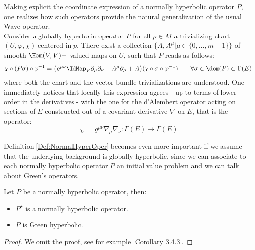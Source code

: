 \documentclass[Main]{subfiles}
\begin{document}
			Making explicit the coordinate expression of a normally hyperbolic operator $P$, one realizes how such operators  provide the natural generalization of the usual Wave operator. 
			\\
			Consider a globally hyperbolic operator $P$ for all $p \in M$ a trivializing chart $(U, \varphi, \chi)$ centered in $p$. 
			There exist a collection $\big\{A, A^\mu \vert \mu\in \{0, \ldots ,m-1\}\big\}$ of smooth 
			$\Hom(V,V)-$ valued maps on $U$, such that $P$ reads as follows:
			\begin{equation}\label{Eq:NormallyHyperbolicRepresentation}
				\chi \circ ( P \sigma) \circ \varphi^{-1} =
				\big( g^{\mu \nu} \IdMap_V \partial_\mu \partial_\nu + A^\mu \partial_\mu + A\big)
				(\chi \circ \sigma \circ \varphi^{-1} ) 
				\qquad \forall \sigma \in \dom(P) \subset \Gamma(E)
			\end{equation}
		where both the chart and the vector bundle trivializations are understood. 
		One immediately notices that locally this expression agrees  - up to terms of lower order in the derivatives  - with the one for the d'Alembert operator acting on sections of $E$  constructed out of a covariant derivative $\nabla$ on $E$, that is the operator:
		\begin{displaymath}
			\square_\nabla = g^{\mu \nu} \nabla_\mu \nabla_\nu : \Gamma(E) \rightarrow \Gamma(E)
		\end{displaymath}

		Definition \ref{Def:NormalHyperOper} becomes even more important if we assume that the underlying background is globally hyperbolic, since we can associate to each normally hyperbolic operator $P$ an initial value problem and we can talk about Green's operators.
		\begin{proposition}
			Let $P$ be a normally hyperbolic operator, then:
			\begin{itemize}
				\item	$P^\star$ is a normally hyperbolic operator.
				\item $P$ is Green hyperbolic.
			\end{itemize}
		\end{proposition}	
		\begin{proof}
			We omit the proof, see for example \cite{Baer2008}[Corollary 3.4.3].
		\end{proof}
		
\end{document}
